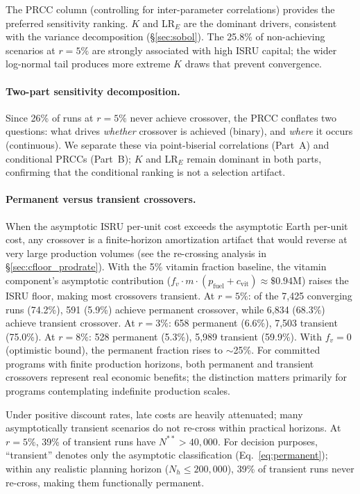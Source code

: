 \documentclass[preprint,12pt]{elsarticle}
\begin{document}
The PRCC column (controlling for inter-parameter correlations) provides the preferred sensitivity ranking. $K$ and LR$_E$ are the dominant drivers, consistent with the variance decomposition (\S\ref{sec:sobol}). The 25.8\% of non-achieving scenarios at $r = 5\%$ are strongly associated with high ISRU capital; the wider log-normal tail produces more extreme $K$ draws that prevent convergence.

\paragraph{Two-part sensitivity decomposition.} Since 26\% of runs at $r = 5\%$ never achieve crossover, the PRCC conflates two questions: what drives \emph{whether} crossover is achieved (binary), and \emph{where} it occurs (continuous). We separate these via point-biserial correlations (Part~A) and conditional PRCCs (Part~B); $K$ and LR$_E$ remain dominant in both parts, confirming that the conditional ranking is not a selection artifact.

\paragraph{Permanent versus transient crossovers.} When the asymptotic ISRU per-unit cost exceeds the asymptotic Earth per-unit cost, any crossover is a finite-horizon amortization artifact that would reverse at very large production volumes (see the re-crossing analysis in \S\ref{sec:cfloor_prodrate}). With the 5\% vitamin fraction baseline, the vitamin component's asymptotic contribution ($f_v \cdot m \cdot (p_{\mathrm{fuel}} + c_{\mathrm{vit}}) \approx \$0.94$M) raises the ISRU floor, making most crossovers transient. At $r = 5\%$: of the 7{,}425 converging runs (74.2\%), 591 (5.9\%) achieve permanent crossover, while 6{,}834 (68.3\%) achieve transient crossover. At $r = 3\%$: 658 permanent (6.6\%), 7{,}503 transient (75.0\%). At $r = 8\%$: 528 permanent (5.3\%), 5{,}989 transient (59.9\%). With $f_v = 0$ (optimistic bound), the permanent fraction rises to $\sim$25\%. For committed programs with finite production horizons, both permanent and transient crossovers represent real economic benefits; the distinction matters primarily for programs contemplating indefinite production scales.

Under positive discount rates, late costs are heavily attenuated; many asymptotically transient scenarios do not re-cross within practical horizons. At $r = 5\%$, 39\% of transient runs have $N^{**} > 40{,}000$. For decision purposes, ``transient'' denotes only the asymptotic classification (Eq.~\ref{eq:permanent}); within any realistic planning horizon ($N_h \leq 200{,}000$), 39\% of transient runs never re-cross, making them functionally permanent.
\end{document}
